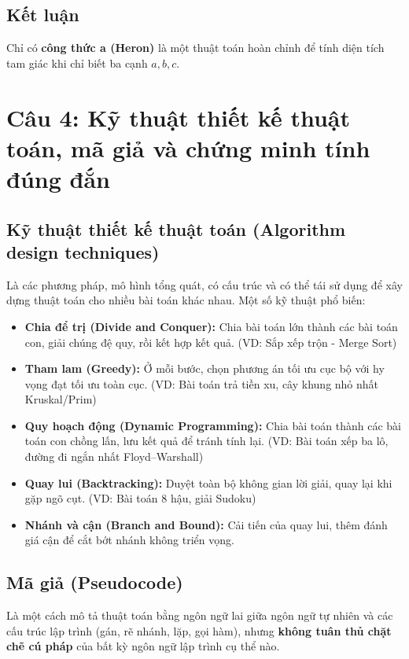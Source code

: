 \documentclass[12pt,a4paper]{article}
\begin{document}
\subsection*{Kết luận}
Chỉ có \textbf{công thức a (Heron)} là một thuật toán hoàn chỉnh để tính diện tích tam giác khi chỉ biết ba cạnh $a,b,c$.

\section*{Câu 4: Kỹ thuật thiết kế thuật toán, mã giả và chứng minh tính đúng đắn}

\subsection*{Kỹ thuật thiết kế thuật toán (Algorithm design techniques)}
Là các phương pháp, mô hình tổng quát, có cấu trúc và có thể tái sử dụng để xây dựng thuật toán cho nhiều bài toán khác nhau. Một số kỹ thuật phổ biến:
\begin{itemize}
    \item \textbf{Chia để trị (Divide and Conquer):} Chia bài toán lớn thành các bài toán con, giải chúng đệ quy, rồi kết hợp kết quả. (VD: Sắp xếp trộn - Merge Sort)
    \item \textbf{Tham lam (Greedy):} Ở mỗi bước, chọn phương án tối ưu cục bộ với hy vọng đạt tối ưu toàn cục. (VD: Bài toán trả tiền xu, cây khung nhỏ nhất Kruskal/Prim)
    \item \textbf{Quy hoạch động (Dynamic Programming):} Chia bài toán thành các bài toán con chồng lấn, lưu kết quả để tránh tính lại. (VD: Bài toán xếp ba lô, đường đi ngắn nhất Floyd–Warshall)
    \item \textbf{Quay lui (Backtracking):} Duyệt toàn bộ không gian lời giải, quay lại khi gặp ngõ cụt. (VD: Bài toán 8 hậu, giải Sudoku)
    \item \textbf{Nhánh và cận (Branch and Bound):} Cải tiến của quay lui, thêm đánh giá cận để cắt bớt nhánh không triển vọng.
\end{itemize}

\subsection*{Mã giả (Pseudocode)}
Là một cách mô tả thuật toán bằng ngôn ngữ lai giữa ngôn ngữ tự nhiên và các cấu trúc lập trình (gán, rẽ nhánh, lặp, gọi hàm), nhưng \textbf{không tuân thủ chặt chẽ cú pháp} của bất kỳ ngôn ngữ lập trình cụ thể nào.
\end{document}
